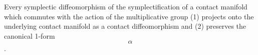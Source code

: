 Every symplectic diffeomorphism of the symplectification of a contact manifold which commutes with the action of the multiplicative group (1) projects onto the underlying contact manifold as a contact diffeomorphism and (2) preserves the canonical 1-form $$\alpha$$.
